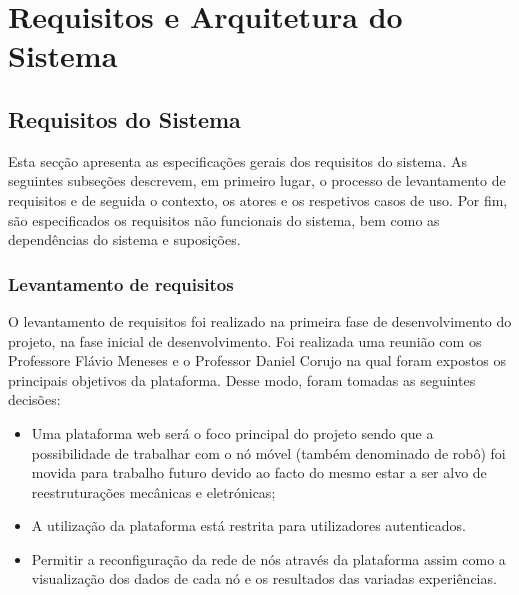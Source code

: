 \chapter{Requisitos e Arquitetura do Sistema}
\label{chp:requirements}
\section{Requisitos do Sistema}
Esta secção apresenta as especificações gerais dos requisitos do sistema. As seguintes subseções descrevem, em primeiro lugar, o processo de levantamento de requisitos e de seguida o contexto, os atores e os respetivos casos de uso. Por fim, são especificados os requisitos não funcionais do sistema, bem como as dependências do sistema e suposições.

\subsection{Levantamento de requisitos}
O levantamento de requisitos foi realizado na primeira fase de desenvolvimento do projeto,  na fase inicial de desenvolvimento. Foi realizada uma reunião com os Professore Flávio Meneses e o Professor Daniel Corujo na qual foram expostos os principais objetivos da plataforma.\newline
Desse modo, foram tomadas as seguintes decisões:
\begin{itemize}[noitemsep]
    \item Uma plataforma web será o foco principal do projeto sendo que a possibilidade de trabalhar com o nó móvel (também denominado de robô) foi movida para trabalho futuro devido ao facto do mesmo estar a ser alvo de reestruturações mecânicas e eletrónicas;
    \item A utilização da plataforma está restrita para utilizadores autenticados.
    \item Permitir a reconfiguração da rede de nós através da plataforma assim como a visualização dos dados de cada nó e os resultados das variadas experiências.
\end{itemize}

